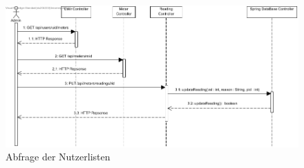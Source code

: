 \begin{figure}[H]
	\centering
	\includegraphics[width = 15cm]{img/diagrams/ChangeReading}
	\caption{Abfrage der Nutzerlisten}
\end{figure}